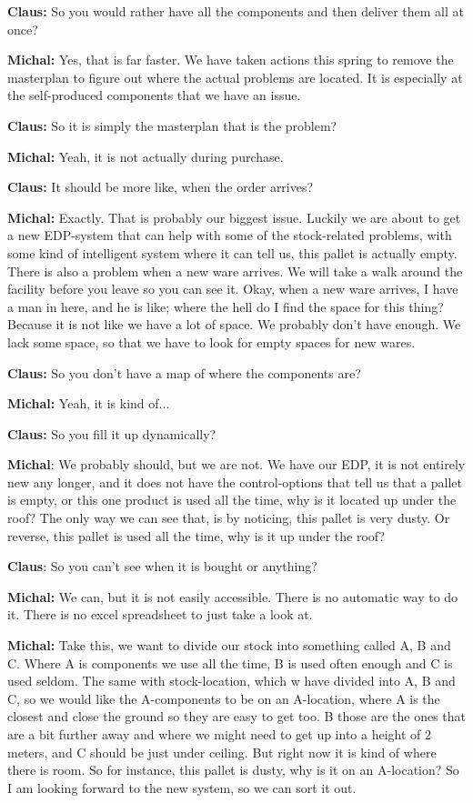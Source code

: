 \textbf{Claus:} So you would rather have all the components and then deliver
them all at once?\nl

\textbf{Michal:} Yes, that is far faster. We have taken actions this spring to
remove the masterplan to figure out where the actual problems are located. It is
especially at the self-produced components that we have an issue.\nl

\textbf{Claus:} So it is simply the masterplan that is the problem? \nl

\textbf{Michal:} Yeah, it is not actually during purchase. \nl

\textbf{Claus:} It should be more like, when the order arrives?\nl

\textbf{Michal:} Exactly. That is probably our biggest issue. Luckily we are
about to get a new EDP-system that can help with some of the stock-related
problems, with some kind of intelligent system where it can tell us, this pallet
is actually empty. There is also a problem when a new ware arrives. We will take
a walk around the facility before you leave so you can see it. Okay, when a new
ware arrives, I have a man in here, and he is like; where the hell do I find
the space for this thing? Because it is not like we have a lot of space. We
probably don't have enough. We lack some space, so that we have to look for
empty spaces for new wares.\nl

\textbf{Claus:} So you don't have a map of where the components are? \nl

\textbf{Michal:} Yeah, it is kind of... \nl

\textbf{Claus:} So you fill it up dynamically?\nl

\textbf{Michal}: We probably should, but we are not. We have our EDP, it is not
entirely new any longer, and it does not have the control-options that tell us
that a pallet is empty, or this one product is used all the time, why is it
located up under the roof? The only way we can see that, is by noticing, this
pallet is very dusty. Or reverse, this pallet is used all the time, why is it up
under the roof? 

\textbf{Claus}: So you can't see when it is bought or anything? \nl

\textbf{Michal:} We can, but it is not easily accessible. There is no automatic
way to do it. There is no excel spreadsheet to just take a look at.\nl

\textbf{Michal:} Take this, we want to divide our stock into something called A,
B and C. Where A is components we use all the time, B is used often enough and C
is used seldom. The same with stock-location, which w have divided into A, B
and C, so we would like the A-components to be on an A-location, where A is the
closest and close the ground so they are easy to get too. B those are the ones
that are a bit further away and where we might need to get up into a height of 2 meters,
and C should be just under ceiling. But right now it is kind of where there is
room. So for instance, this pallet is dusty, why is it on an A-location? So I am
looking forward to the new system, so we can sort it out.\nl

